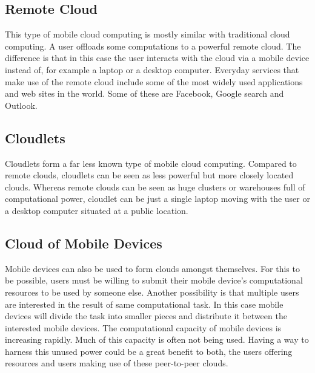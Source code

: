 \documentclass[conference]{IEEEtran}
\begin{document}
\subsection{Remote Cloud}
This type of mobile cloud computing is mostly similar with traditional cloud computing. A user offloads some computations to a powerful remote cloud. The difference is that in this case the user interacts with the cloud via a mobile device instead of, for example a laptop or a desktop computer. Everyday services that make use of the remote cloud include some of the most widely used applications and web sites in the world. Some of these are Facebook, Google search and Outlook.

\subsection{Cloudlets}
Cloudlets form a far less known type of mobile cloud computing. Compared to remote clouds, cloudlets can be seen as less powerful but more closely located clouds. Whereas remote clouds can be seen as huge clusters or warehouses full of computational power, cloudlet can be just a single laptop moving with the user or a desktop computer situated at a public location.

\subsection{Cloud of Mobile Devices}
Mobile devices can also be used to form clouds amongst themselves. For this to be possible, users must be willing to submit their mobile device's computational resources to be used by someone else. Another possibility is that multiple users are interested in the result of same computational task. In this case mobile devices will divide the task into smaller pieces and distribute it between the interested mobile devices. The computational capacity of mobile devices is increasing rapidly. Much of this capacity is often not being used. Having a way to harness this unused power could be a great benefit to both, the users offering resources and users making use of these peer-to-peer clouds.\\
\end{document}
